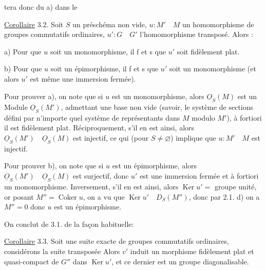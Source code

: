tera donc du a) dans le

\uline{Corollaire} 3.2. Soit $S$ un préschéma non vide, $u:M'\quad M$ un homomorphisme de groupes commutatifs ordinaires, $u':G\quad G'$ l'homomorphisme transposé. Alors :

a) Pour que $u$ soit un monomorphisme, il f et s que $u'$ soit fidèlement plat.

b) Pour que $u$ soit un épimorphisme, il f et s que $u'$ soit un monomorphisme (et alors $u'$ est même une immersion fermée).

Pour prouver a), on note que si $u$ est un monomorphisme, alors $\underline{O}_S(M)$ est un Module  $\underline{O}_S(M')$,  admettant une base non vide (savoir, le système de sections défini par n'importe quel système de représentants dans $M$ modulo $M'$), à fortiori il est fidèlement plat. Réciproquement, s'il en est ainsi, alors $\underline{O}_S(M')\quad\underline{O}_S(M)$ est injectif, ce qui (pour $S\ne\varnothing$) implique que $u:M'\quad M$ est injectif.

Pour prouver b), on note que si $u$ est un épimorphisme, alors $\underline{O}_S(M')\quad\underline{O}_S(M)$ est surjectif, donc $u'$ est une immersion fermée et à fortiori un monomorphisme. Inversement, s'il en est ainsi, alors $\operatorname{Ker}u'={}$ groupe unité, or  posant $M''=\operatorname{Coker}u$, on a vu que $\operatorname{Ker}u'\quad D_S(M'')$, donc par 2.1. d) on a $M''=0$ donc $u$ est un épimorphisme.

On conclut de 3.1. de la façon habituelle:

\uline{Corollaire} 3.3. Soit
une suite exacte de groupes commutatifs ordinaires, considérons la suite transposée
Alors $v'$ induit un morphisme fidèlement plat et quasi-compact de $G''$ dans $\operatorname{Ker}u'$, et ce dernier est un groupe diagonalisable.


